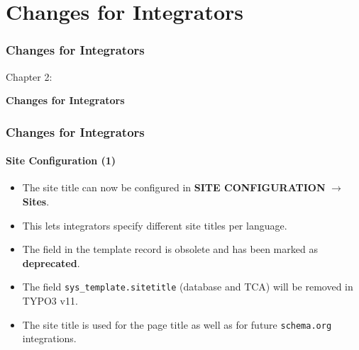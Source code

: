 %

\section{Changes for Integrators}
\begin{frame}[fragile]
	\frametitle{Changes for Integrators}

	\begin{center}\huge{Chapter 2:}\end{center}
	\begin{center}\huge{\color{typo3darkgrey}\textbf{Changes for Integrators}}\end{center}

\end{frame}


\begin{frame}[fragile]
	\frametitle{Changes for Integrators}
	\framesubtitle{Site Configuration (1)}

	\begin{itemize}

		\item The site title can now be configured in
			\textbf{SITE CONFIGURATION} $\rightarrow$ \textbf{Sites}.
		\item This lets integrators specify different site titles per language.
		\item The field in the template record is obsolete and has been marked as \textbf{deprecated}.
		\item The field \texttt{sys\_template.sitetitle} (database and TCA) will be removed in TYPO3 v11.
		\item The site title is used for the page title as well as for
			future \texttt{schema.org} integrations.
	\end{itemize}

\end{frame}


